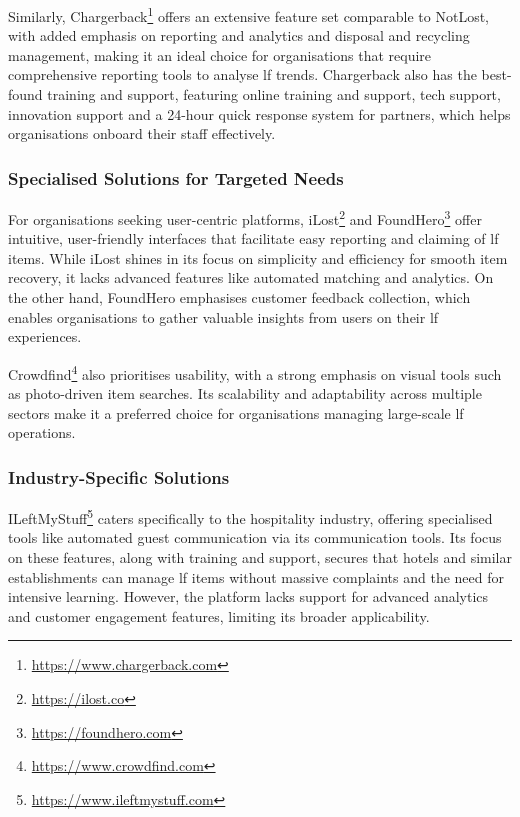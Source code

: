 Similarly, Chargerback\footnote{\url{https://www.chargerback.com}} offers an extensive feature set comparable to NotLost, with added emphasis on reporting and analytics and disposal and recycling management, making it an ideal choice for organisations that require comprehensive reporting tools to analyse \ac{lf} trends. Chargerback also has the best-found training and support, featuring online training and support, tech support, innovation support and a 24-hour quick response system for partners, which helps organisations onboard their staff effectively.

\subsubsection{Specialised Solutions for Targeted Needs} \label{subsubsec:specialised-solutions}

For organisations seeking user-centric platforms, iLost\footnote{\url{https://ilost.co}} and FoundHero\footnote{\url{https://foundhero.com}} offer intuitive, user-friendly interfaces that facilitate easy reporting and claiming of \ac{lf} items. While iLost shines in its focus on simplicity and efficiency for smooth item recovery, it lacks advanced features like automated matching and analytics. On the other hand, FoundHero emphasises customer feedback collection, which enables organisations to gather valuable insights from users on their \ac{lf} experiences.

Crowdfind\footnote{\url{https://www.crowdfind.com}} also prioritises usability, with a strong emphasis on visual tools such as photo-driven item searches. Its scalability and adaptability across multiple sectors make it a preferred choice for organisations managing large-scale \ac{lf} operations.

\subsubsection{Industry-Specific Solutions} \label{subsubsec:industry-specific-solutions}

ILeftMyStuff\footnote{\url{https://www.ileftmystuff.com}} caters specifically to the hospitality industry, offering specialised tools like automated guest communication via its communication tools. Its focus on these features, along with training and support, secures that hotels and similar establishments can manage \ac{lf} items without massive complaints and the need for intensive learning. However, the platform lacks support for advanced analytics and customer engagement features, limiting its broader applicability.

